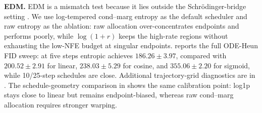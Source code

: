 \documentclass{article}
\theoremstyle{plain}
\theoremstyle{definition}
\theoremstyle{remark}
\begin{document}
\textbf{EDM.} EDM is a mismatch test because it lies outside the Schr\"odinger-bridge setting \citep{karras2022edm}. We use log-tempered cond--marg entropy as the default scheduler and raw entropy as the ablation: raw allocation over-concentrates endpoints and performs poorly, while \(\log(1+r)\) keeps the high-rate regions without exhausting the low-NFE budget at singular endpoints.  reports the full ODE-Heun FID sweep: at five steps entropic achieves $186.26\pm3.97$, compared with $200.52\pm2.91$ for linear, $238.03\pm5.29$ for cosine, and $355.06\pm2.20$ for sigmoid, while 10/25-step schedules are close.     Additional trajectory-grid diagnostics are in . The schedule-geometry comparison in  shows the same calibration point: log1p stays close to linear but remains endpoint-biased, whereas raw cond--marg allocation requires stronger warping.
\end{document}
